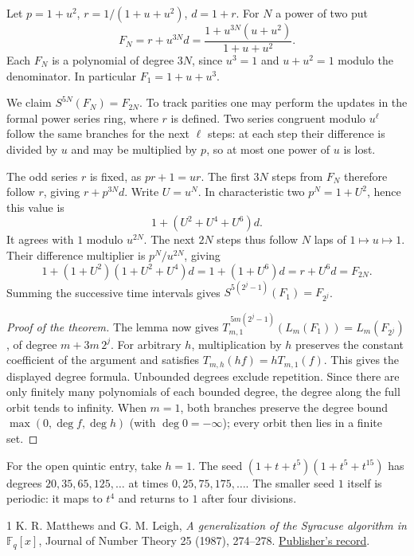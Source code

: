 \documentclass[11pt,a4paper]{article}
\newcommand{\Tm}{T_{m,1}}
\begin{document}
Let \(p=1+u^2\), \(r=1/(1+u+u^2)\), \(d=1+r\). For \(N\) a power of two put
\[
 F_N=r+u^{3N}d
     =\frac{1+u^{3N}(u+u^2)}{1+u+u^2}.
\]
Each \(F_N\) is a polynomial of degree \(3N\), since \(u^3=1\) and \(u+u^2=1\) modulo the denominator. In particular \(F_1=1+u+u^3\).

We claim \(S^{5N}(F_N)=F_{2N}\). To track parities one may perform the updates in the formal power series ring, where \(r\) is defined. Two series congruent modulo \(u^\ell\) follow the same branches for the next \(\ell\) steps: at each step their difference is divided by \(u\) and may be multiplied by \(p\), so at most one power of \(u\) is lost.

The odd series \(r\) is fixed, as \(pr+1=ur\). The first \(3N\) steps from \(F_N\) therefore follow \(r\), giving \(r+p^{3N}d\). Write \(U=u^N\). In characteristic two \(p^N=1+U^2\), hence this value is
\[
     1+(U^2+U^4+U^6)d.
\]
It agrees with \(1\) modulo \(u^{2N}\). The next \(2N\) steps thus follow \(N\) laps of \(1\mapsto u\mapsto1\). Their difference multiplier is \(p^N/u^{2N}\), giving
\[
  1+(1+U^2)(1+U^2+U^4)d
   =1+(1+U^6)d
   =r+U^6d=F_{2N}.
\]
Summing the successive time intervals gives \(S^{5(2^j-1)}(F_1)=F_{2^j}\).

\begin{proof}[Proof of the theorem]
The lemma now gives \(\Tm^{\,5m(2^j-1)}(L_m(F_1))=L_m(F_{2^j})\), of degree \(m+3m\,2^j\). For arbitrary \(h\), multiplication by \(h\) preserves the constant coefficient of the argument and satisfies \(T_{m,h}(hf)=h\Tm(f)\). This gives the displayed degree formula. Unbounded degrees exclude repetition. Since there are only finitely many polynomials of each bounded degree, the degree along the full orbit tends to infinity. When \(m=1\), both branches preserve the degree bound \(\max(0,\deg f,\deg h)\) (with \(\deg 0=-\infty\)); every orbit then lies in a finite set.
\end{proof}

For the open quintic entry, take \(h=1\). The seed \((1+t+t^5)(1+t^5+t^{15})\) has degrees \(20,35,65,125,\ldots\) at times \(0,25,75,175,\ldots\). The smaller seed \(1\) itself is periodic: it maps to \(t^4\) and returns to \(1\) after four divisions.

\begin{thebibliography}{1}
 K. R. Matthews and G. M. Leigh, \emph{A generalization of the Syracuse algorithm in \(\mathbb F_q[x]\)}, Journal of Number Theory 25 (1987), 274--278. \href{https://www.sciencedirect.com/science/article/pii/0022314X87900321}{Publisher's record}.
\end{thebibliography}
\end{document}
